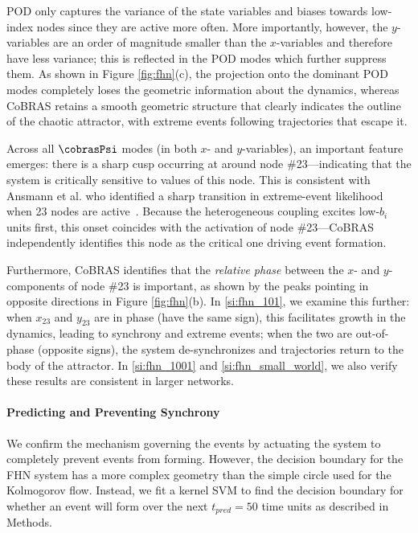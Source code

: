 \documentclass[twocolumn,10pt]{article}
\begin{document}
%
POD  only captures the variance of the state variables and biases towards low-index nodes since they are active more often. More importantly, however, the $y$-variables are an order of magnitude smaller than the $x$-variables and therefore have less variance; this is reflected in the POD modes which further suppress them. As shown in Figure \ref{fig:fhn}(c), the projection onto the dominant POD modes completely loses the geometric information about the dynamics, whereas CoBRAS retains a smooth geometric structure that clearly indicates the outline of the chaotic attractor, with extreme events following trajectories that escape it.
%

Across all $\cobrasPsi$ modes (in both $x$- and $y$-variables), an important feature emerges: there is a sharp cusp occurring at around node \#23---indicating that the system is critically sensitive to values of this node. This is consistent with Ansmann et al. who identified a sharp transition in extreme-event likelihood when 23 nodes are active~\cite{ansmann2013a}. Because the heterogeneous coupling excites low-$b_i$ units first, this onset coincides with the activation of node \#23---CoBRAS independently identifies this node as the critical one driving event formation.
%

Furthermore, CoBRAS identifies that the \textit{relative phase} between the $x$- and $y$-components of node \#23 is important, as shown by the peaks pointing in opposite directions in Figure \ref{fig:fhn}(b). In \ref{si:fhn_101}, we examine this further: when $x_{23}$ and $y_{23}$ are in phase (have the same sign), this facilitates growth in the dynamics, leading to synchrony and extreme events; when the two are out-of-phase (opposite signs), the system de-synchronizes and trajectories return to the body of the attractor. In \ref{si:fhn_1001} and \ref{si:fhn_small_world}, we also verify these results are consistent in larger networks.

\paragraph{Predicting and Preventing Synchrony}
We confirm the mechanism governing the events by actuating the system to completely prevent events from forming. However, the decision boundary for the FHN system has a more complex geometry than the simple circle used for the Kolmogorov flow. Instead, we fit a kernel SVM to find the decision boundary for whether an event will form over the next $t_{pred} = 50$ time units as described in Methods. 
%
\end{document}
